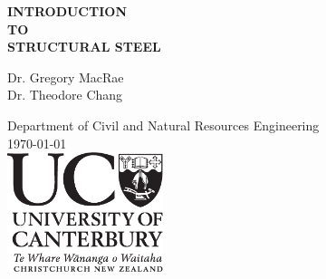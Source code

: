 \pagestyle{empty}
\begin{titlepage}
\vspace*{\fill}
\begin{flushright}\begin{spacing}{1.5}\HUGE
\textbf{INTRODUCTION\\TO\\STRUCTURAL STEEL}
\end{spacing}\end{flushright}
\vspace*{1cm}
\begin{flushright}\begin{spacing}{1.2}\LARGE
Dr. Gregory MacRae\\[.5cm]
Dr. Theodore Chang
\end{spacing}\end{flushright}
\vspace*{2cm}
\begin{center}\Large
Department of Civil and Natural Resources Engineering\\[1cm]
\today\\[1cm]
\includegraphics[height=3.5cm]{PIC/MISC/UCBLACK}
\end{center}
\vspace*{\fill}
\end{titlepage}
\cleardoublepage
%
\pagestyle{fancy}
\renewcommand{\sectionmark}[1]{\markright{\thesection~#1}}
\renewcommand{\chaptermark}[1]{\markboth{#1}{}}